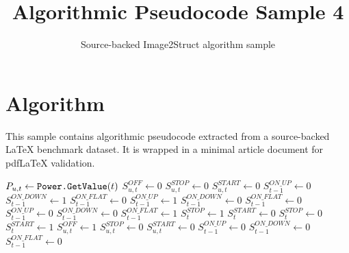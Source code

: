 \documentclass[11pt]{article}
\title{Algorithmic Pseudocode Sample 4}
\author{Source-backed Image2Struct algorithm sample}
\date{}
\begin{document}
\maketitle
\section{Algorithm}
This sample contains algorithmic pseudocode extracted from a source-backed LaTeX benchmark dataset. It is wrapped in a minimal article document for pdfLaTeX validation.

\begin{algorithm}[htbp]
\caption{Source-backed algorithmic procedure}
\begin{algorithmic}
\State $P_{u,t}\leftarrow\textrm{{\tt Power.GetValue}}(t)$
\EndFor
{}
\State $S_{u,t}^{OFF} \leftarrow 0$
\State $S_{u,t}^{STOP} \leftarrow 0$
\State $S_{u,t}^{START} \leftarrow 0$
\State $S_{t-1}^{ON\_UP} \leftarrow 0$
\State $S_{t-1}^{ON\_DOWN} \leftarrow 1$
\State $S_{t-1}^{ON\_FLAT} \leftarrow 0$
\State $S_{t-1}^{ON\_UP} \leftarrow 1$
\State $S_{t-1}^{ON\_DOWN} \leftarrow 0$
\State $S_{t-1}^{ON\_FLAT} \leftarrow 0$
\State $S_{t-1}^{ON\_UP} \leftarrow 0$
\State $S_{t-1}^{ON\_DOWN} \leftarrow 0$
\State $S_{t-1}^{ON\_FLAT} \leftarrow 1$
\EndIf
{}
\State $S_{t}^{STOP} \leftarrow 1$
\State $S_{t}^{START} \leftarrow 0$
\Else
\State $S_{t}^{STOP} \leftarrow 0$
\State $S_{t}^{START} \leftarrow 1$
\EndIf
\Else{}
\State $S_{u,t}^{OFF} \leftarrow 1$
\State $S_{u,t}^{STOP} \leftarrow 0$
\State $S_{u,t}^{START} \leftarrow 0$
\State $S_{t-1}^{ON\_UP} \leftarrow 0$
\State $S_{t-1}^{ON\_DOWN} \leftarrow 0$
\State $S_{t-1}^{ON\_FLAT} \leftarrow 0$
\EndIf
\EndFor
\end{algorithmic}
\end{algorithm}
\end{document}
